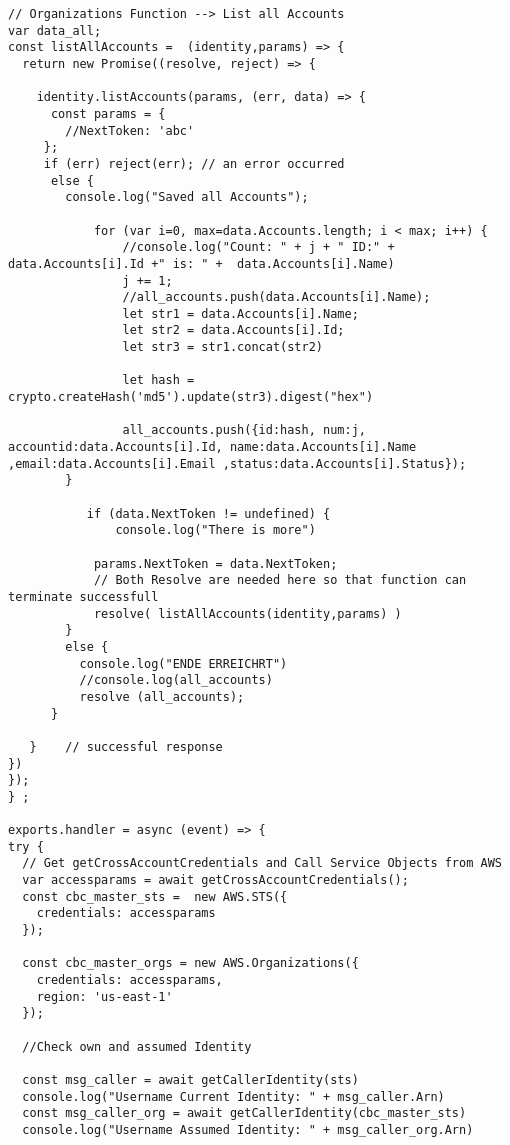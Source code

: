\begin{lstlisting}[caption={Lambda-Code in NodeJS},
label=lst:LambdaCode,basicstyle=\ttfamily\small ]
// Organizations Function --> List all Accounts
var data_all;
const listAllAccounts =  (identity,params) => {
  return new Promise((resolve, reject) => {

    identity.listAccounts(params, (err, data) => {
      const params = {
        //NextToken: 'abc'
     };
     if (err) reject(err); // an error occurred
      else {
        console.log("Saved all Accounts");

            for (var i=0, max=data.Accounts.length; i < max; i++) {
                //console.log("Count: " + j + " ID:" + data.Accounts[i].Id +" is: " +  data.Accounts[i].Name)
                j += 1;
                //all_accounts.push(data.Accounts[i].Name);
                let str1 = data.Accounts[i].Name;
                let str2 = data.Accounts[i].Id;
                let str3 = str1.concat(str2)

                let hash = crypto.createHash('md5').update(str3).digest("hex")

                all_accounts.push({id:hash, num:j, accountid:data.Accounts[i].Id, name:data.Accounts[i].Name ,email:data.Accounts[i].Email ,status:data.Accounts[i].Status});
        }

           if (data.NextToken != undefined) {
               console.log("There is more")

            params.NextToken = data.NextToken;
            // Both Resolve are needed here so that function can terminate successfull
            resolve( listAllAccounts(identity,params) )
        }
        else {
          console.log("ENDE ERREICHRT")
          //console.log(all_accounts)
          resolve (all_accounts);
      }

   }    // successful response
})
});
} ;

exports.handler = async (event) => {
try {
  // Get getCrossAccountCredentials and Call Service Objects from AWS
  var accessparams = await getCrossAccountCredentials();
  const cbc_master_sts =  new AWS.STS({
    credentials: accessparams
  });

  const cbc_master_orgs = new AWS.Organizations({
    credentials: accessparams,
    region: 'us-east-1'
  });

  //Check own and assumed Identity

  const msg_caller = await getCallerIdentity(sts)
  console.log("Username Current Identity: " + msg_caller.Arn)
  const msg_caller_org = await getCallerIdentity(cbc_master_sts)
  console.log("Username Assumed Identity: " + msg_caller_org.Arn)


\end{lstlisting}
